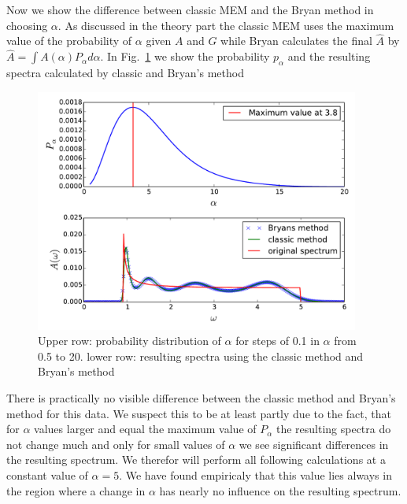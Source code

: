 Now we show the difference between classic MEM and the Bryan method in choosing $\alpha$. As discussed in the theory part the classic MEM uses the maximum value of the probability of $\alpha$ given $A$ and $G$ while Bryan calculates the final $\hat{A}$ by  $\hat{A} = \int A(\alpha) P_{\alpha} d\alpha$. In Fig.~\ref{results:fig.4} we show the probability $p_{\alpha}$ and the resulting spectra calculated by classic and Bryan's method
\begin{figure}[htbp]
	\centering
	\includegraphics[width=0.95\textwidth]{./images/BCS_Bryan_classic_p_alpha.pdf}
	\caption{Upper row: probability distribution of $\alpha$ for steps of 0.1 in $\alpha$ from 0.5 to 20. lower row: resulting spectra using the classic method and Bryan's method}
	\label{results:fig.4}
\end{figure}
\FloatBarrier
There is practically no visible difference between the classic method and Bryan's method for this data. We suspect this to be at least partly due to the fact, that for $\alpha$ values larger and equal the maximum value of $P_{\alpha}$ the resulting spectra do not change much and only for small values of $\alpha$ we see significant differences in the resulting spectrum. We therefor will perform all following calculations at a constant value of $\alpha = 5$.
We have found empiricaly that this value lies always in the region where a change in $\alpha$ has nearly no influence on the resulting spectrum.
